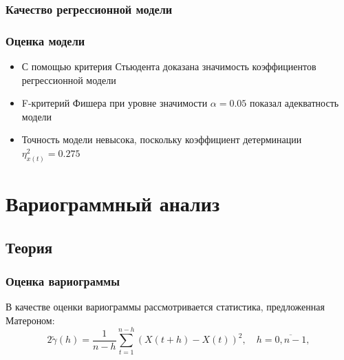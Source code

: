 \documentclass[10pt, ucs, pdf,aspectratio=169]{beamer}
\begin{document}
\subsubsection{Качество регрессионной модели}
\begin{frame}
  \frametitle{Оценка модели}   %
  \begin{itemize}
    \item С помощью критерия Стьюдента доказана значимость коэффициентов регрессионной модели
    \item F-критерий Фишера при уровне значимости $ \alpha = 0.05 $ показал адекватность модели
    \item Точность модели невысока, поскольку коэффициент детерминации $ \eta^2_{x(t)} = 0.275 $
  \end{itemize}
\end{frame}



\section{Вариограммный анализ}

\subsection{Теория}

\begin{frame}
  \frametitle{Оценка вариограммы}   %
  В качестве оценки вариограммы рассмотривается статистика, предложенная Матероном:
  \begin{equation}
    2 \tilde{\gamma}(h) = \frac{1}{n - h} \sum_{t = 1}^{n - h}(X(t + h) - X(t))^2, \quad h = \overline{0, n - 1},
  \end{equation}
\end{frame}
\end{document}
